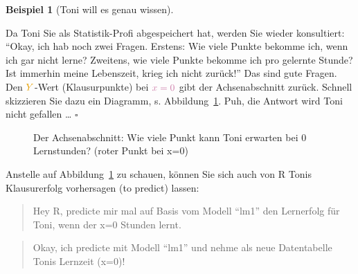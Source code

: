 \documentclass[
  letterpaper,
  oneside,
  open=any]{scrbook}
\theoremstyle{definition}
\theoremstyle{definition}
\newtheorem{example}{Beispiel}[chapter]
\theoremstyle{definition}
\theoremstyle{remark}
\begin{document}
\begin{example}[Toni will es genau
wissen]\protect\hypertarget{exm-noten5}{}\label{exm-noten5}

Da Toni Sie als Statistik-Profi abgespeichert hat, werden Sie wieder
konsultiert: \enquote{Okay, ich hab noch zwei Fragen. Erstens: Wie viele
Punkte bekomme ich, wenn ich gar nicht lerne? Zweitens, wie viele Punkte
bekomme ich pro gelernte Stunde? Ist immerhin meine Lebenszeit, krieg
ich nicht zurück!} {Das sind gute Fragen. Den \(\color{ycol}{Y}\)-Wert
(Klausurpunkte) bei \(\color{xcol}{x}=0\) gibt der Achsenabschnitt
zurück.} Schnell skizzieren Sie dazu ein Diagramm, s.
Abbildung~\ref{fig-beta0}. Puh, die Antwort wird Toni nicht gefallen
\ldots{} \(\square\)

\end{example}

\begin{figure}


\caption{\label{fig-beta0}Der Achsenabschnitt: Wie viele Punkt kann Toni
erwarten bei 0 Lernstunden? (roter Punkt bei x=0)}

\end{figure}%

Anstelle auf Abbildung~\ref{fig-beta0} zu schauen, können Sie sich auch
von R Tonis Klausurerfolg vorhersagen (to predict) lassen:

\begin{quote}
{} Hey R, predicte mir mal auf Basis vom Modell
\enquote{lm1} den Lernerfolg für Toni, wenn der x=0 Stunden lernt.
\end{quote}

\begin{quote}
{} Okay, ich predicte mit Modell \enquote{lm1} und nehme
als neue Datentabelle Tonis Lernzeit (x=0)!
\end{quote}
\end{document}
